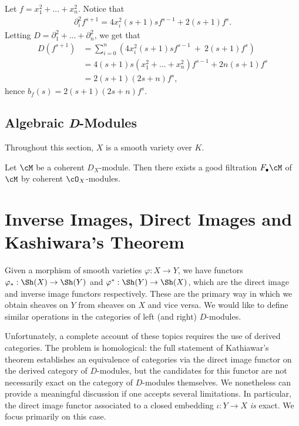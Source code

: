\begin{example}\label{example:explicit-b-function1}
	Let $f = x_1^2+...+x_n^2$. Notice that
	\begin{align*}
		\partial_i^2 f^{s+1} = 4x_i^2(s+1)sf^{s-1} + 2(s+1)f^s.
	\end{align*}
	Letting $D = \partial_1^2 + ... + \partial_n^2$, we get that
	\begin{align*}
		D(f^{s+1})
		  &= \sum_{i=0}^n \left(4x_i^2(s+1)sf^{s-1} ~+~ 2(s+1)f^s\right) \\
		  &= 4(s+1)s(x_1^2+...+x_n^2)f^{s-1} + 2n(s+1)f^s \\
		  &= 2(s+1)(2s+ n)f^s,
	\end{align*}
	hence $b_f(s) = 2(s+1)(2s+n)f^s$.
\end{example}


\subsection{Algebraic \textit{D}-Modules}

Throughout this section, $X$ is a smooth variety over $K$.

\begin{lem}\label{lem:global-good-filtrations-exist}
	Let $\cM$ be a coherent $D_X$-module. Then there exists a good filtration $F_\bullet \cM$ of $\cM$ by coherent $\cO_X$-modules.
\end{lem}

\section{Inverse Images, Direct Images and Kashiwara's Theorem}
Given a morphism of smooth varieties $\varphi:X\to Y$, we have functors $\varphi_*:\Sh(X)\to \Sh(Y)$ and $\varphi^*:\Sh(Y) \to \Sh(X)$, which are the direct image and inverse image functors respectively. These are the primary way in which we obtain sheaves on $Y$ from sheaves on $X$ and vice versa. We would like to define similar operations in the categories of left (and right) $D$-modules. 

Unfortunately, a complete account of these topics requires the use of derived categories. The problem is homological: the full statement of Kathiawar's theorem establishes an equivalence of categories via the direct image functor on the derived category of $D$-modules, but the candidates for this functor are not necessarily exact on the category of $D$-modules themselves. We nonetheless can provide a meaningful discussion if one accepts several limitations. In particular, the direct image functor associated to a closed embedding $\iota:Y\to X$ \emph{is} exact. We focus primarily on this case.

